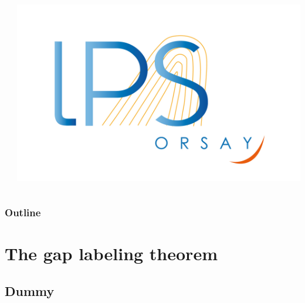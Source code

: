 \documentclass[xcolor=x11names,compress,professionalfonts]{beamer}
\renewcommand{\(}{\begin{columns}}
\renewcommand{\)}{\end{columns}}
\newcommand{\<}[1]{\begin{column}{#1}}
\renewcommand{\>}{\end{column}}
\begin{document}
\begin{frame}
\begin{columns}
\begin{column}{6cm}
\end{column}
\begin{column}{2cm}
~\\
~\\
~\\
~\\
\raggedleft
\includegraphics[scale=.15]{img/logo-lps.jpg}
\end{column}
\end{columns}
\end{frame}

\begin{frame}
\frametitle{Outline}
\tableofcontents[hideallsubsections]
\end{frame}

\section{The gap labeling theorem}
\subsection{Dummy}
\end{document}
